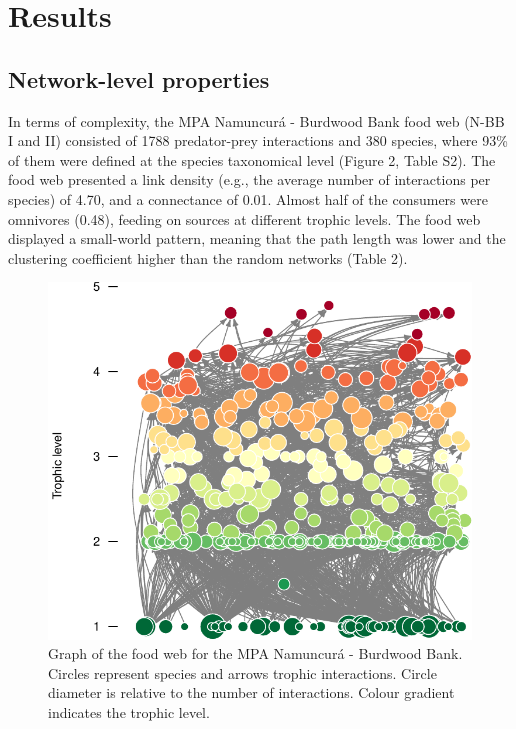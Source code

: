 \documentclass[preprint, 3p,
authoryear]{elsarticle} %
\begin{document}
\hypertarget{results}{%
\section{Results}\label{results}}

\hypertarget{network-level-properties}{%
\subsection{Network-level properties}\label{network-level-properties}}

In terms of complexity, the MPA Namuncurá - Burdwood Bank food web (N-BB
I and II) consisted of 1788 predator-prey interactions and 380 species,
where 93\% of them were defined at the species taxonomical level (Figure
2, Table S2). The food web presented a link density (e.g., the average
number of interactions per species) of 4.70, and a connectance of 0.01.
Almost half of the consumers were omnivores (0.48), feeding on sources
at different trophic levels. The food web displayed a small-world
pattern, meaning that the path length was lower and the clustering
coefficient higher than the random networks (Table 2).

\newpage

\begin{figure}

{\centering \includegraphics{MS_Burdwood_foodweb_files/figure-latex/figure2-1} 

}

\caption{Graph of the food web for the MPA Namuncurá - Burdwood Bank. Circles represent species and arrows trophic interactions. Circle diameter is relative to the number of interactions. Colour gradient indicates the trophic level.}\label{fig:figure2}
\end{figure}
\end{document}
